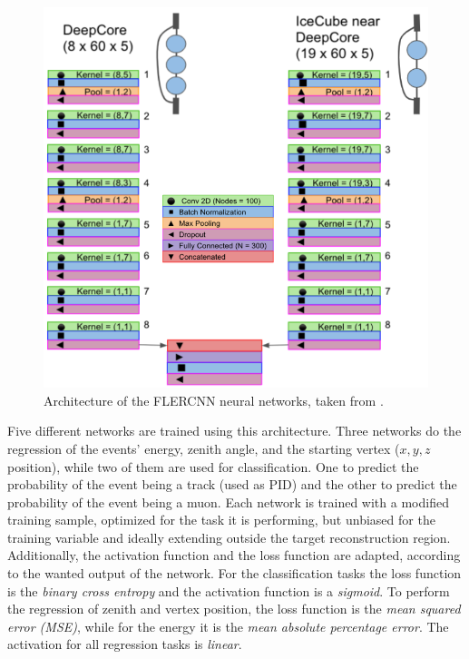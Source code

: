 \begin{figure}
    \includegraphics{figures/simulation_and_processing/flercnn/Detailed_CNN_Architecture_combined.png}
	\caption[FLERCNN architecture]{Architecture of the FLERCNN neural networks, taken from \cite{flercnn_proceedings}.}
\end{figure}


Five different networks are trained using this architecture. Three networks do the regression of the events' energy, zenith angle, and the starting vertex ($x,y,z$ position), while two of them are used for classification. One to predict the probability of the event being a track (used as PID) and the other to predict the probability of the event being a muon. Each network is trained with a modified training sample, optimized for the task it is performing, but unbiased for the training variable and ideally extending outside the target reconstruction region. Additionally, the activation function and the loss function are adapted, according to the wanted output of the network. For the classification tasks the loss function is the \textit{binary cross entropy} and the activation function is a \textit{sigmoid}. To perform the regression of zenith and vertex position, the loss function is the \textit{mean squared error (MSE)}, while for the energy it is the \textit{mean absolute percentage error}. The activation for all regression tasks is \textit{linear}.

